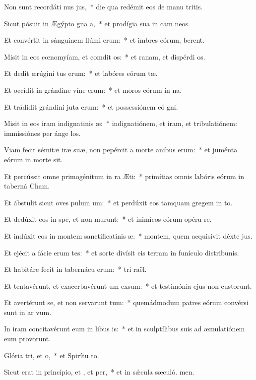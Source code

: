\item Non sunt recordáti nus jus,~* die qua redémit eos de manu tritis.
\item Sicut pósuit in Ægýpto gna a,~* et prodígia sua in cam neos.
\item Et convértit in sánguinem flúmi erum:~* et imbres eórum,  berent.
\item Misit in eos cœnomyíam, et comdit os:~* et ranam, et dispérdi os.
\item Et dedit ærúgini tus erum:~* et labóres eórum tæ.
\item Et occídit in grándine víne erum:~* et moros eórum in na.
\item Et trádidit grándini juta erum:~* et possessiónem eó gni.
\item Misit in eos iram indignatinis æ:~* indignatiónem, et iram, et tribulatiónem: immissiónes per ánge los.
\item Viam fecit sémitæ iræ suæ, non pepércit a morte anibus erum:~* et juménta eórum in morte sit.
\item Et percússit omne primogénitum in ra Æti:~* primítias omnis labóris eórum in taberná Cham.
\item Et ábstulit sicut oves pulum um:~* et perdúxit eos tamquam gregem in to.
\item Et dedúxit eos in spe, et non murunt:~* et inimícos eórum opéru re.
\item Et indúxit eos in montem sanctificatinis æ:~* montem, quem acquisívit déxte jus.
\item Et ejécit a fácie erum tes:~* et sorte divísit eis terram in funículo distribunis.
\item Et habitáre fecit in tabernácu erum:~* tri raël.
\item Et tentavérunt, et exacerbavérunt um exsum:~* et testimónia ejus non custorunt.
\item Et avertérunt se, et non servarunt tum:~* quemádmodum patres eórum convérsi sunt in ar vum.
\item In iram concitavérunt eum in libus is:~* et in sculptílibus suis ad æmulatiónem eum provorunt.
\item Glória tri, et o,~* et Spirítu to.
\item Sicut erat in princípio, et , et per,~* et in sǽcula sæculó. men.
